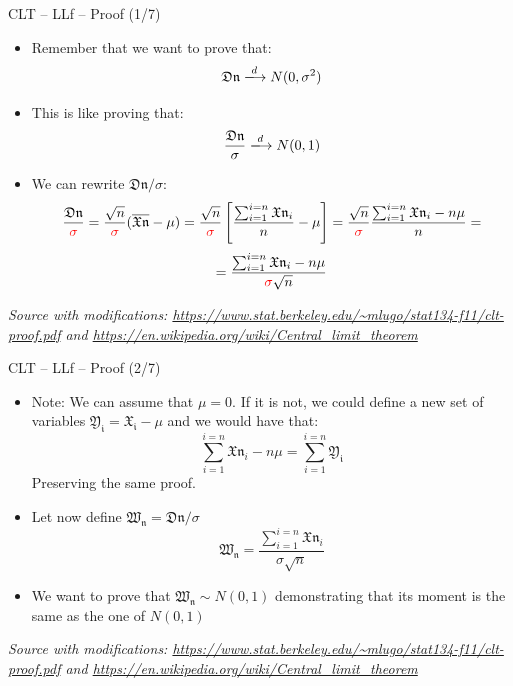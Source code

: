\documentclass{beamer}
\begin{document}
\begin{frame}
{\centerline{CLT -- LLf -- Proof (1/7)}}


\begin{itemize}
\item Remember that we want to prove that:
$$\mathfrak{Dn} \xlongrightarrow{d} N(0,\sigma^2)$$
\item This is like proving that:
$$\frac{\mathfrak{Dn}}{\sigma} \xlongrightarrow{d} N(0,1)$$
\item We can rewrite $\mathfrak{Dn}/\sigma$:
$$\frac{\mathfrak{Dn}}{\textcolor{red}{\sigma}} = \frac{\sqrt{n}}{\textcolor{red}{\sigma}}(\overline{\mathfrak{Xn}}-\mu) = \frac{\sqrt{n}}{\textcolor{red}{\sigma}} \left [ \frac{\sum_{i=1}^{i=n}{\mathfrak{Xn}_i}}{n} - \mu \right ]
= \frac{\sqrt{n}}{\textcolor{red}{\sigma}} \frac{\sum_{i=1}^{i=n}{\mathfrak{Xn}_i} -  n\mu}{n}  =$$
$$
= \frac{\sum_{i=1}^{i=n}{\mathfrak{Xn}_i} -  n\mu}{\textcolor{red}{\sigma}\sqrt{n}} $$

\end{itemize}

\textit{\tiny
\vspace{-\baselineskip}
Source with modifications: \url{https://www.stat.berkeley.edu/~mlugo/stat134-f11/clt-proof.pdf} and \url{https://en.wikipedia.org/wiki/Central_limit_theorem}}
\end{frame}

\begin{frame}
{\centerline{CLT -- LLf -- Proof (2/7)}}


\begin{itemize}
\item Note: We can assume that $\mu=0$. If it is not, we could define a new set of variables $\mathfrak{Y_i} = \mathfrak{X_i} - \mu$ and we would have that:
$$\sum_{i=1}^{i=n}\mathfrak{Xn}_i -  n\mu = \sum_{i=1}^{i=n} \mathfrak{Y_i}$$
Preserving the same proof.
\item Let now define $\mathfrak{W_n} = \mathfrak{Dn}/\sigma$
$$\mathfrak{W_n}= \frac{\sum_{i=1}^{i=n}{\mathfrak{Xn}_i} }{\sigma\sqrt{n}} $$
\item We want to prove that $\mathfrak{W_n} \sim N(0,1)$ demonstrating that its moment is the same as the one of $N(0,1)$
\end{itemize}

\textit{\tiny
\vspace{-\baselineskip}
Source with modifications: \url{https://www.stat.berkeley.edu/~mlugo/stat134-f11/clt-proof.pdf} and \url{https://en.wikipedia.org/wiki/Central_limit_theorem}}
\end{frame}
\end{document}
